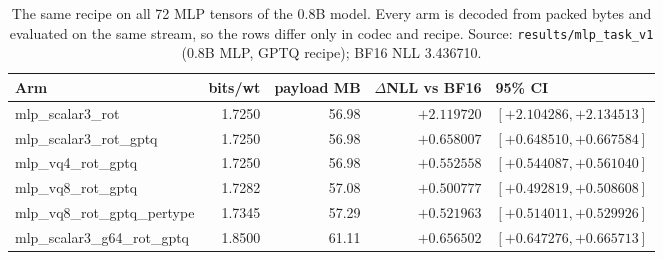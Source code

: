 \begin{table}[t]
\centering
\small
\begin{tabular}{lrrrl}
\toprule
Arm & bits/wt & payload MB & $\Delta$NLL vs BF16 & 95\% CI \\
\midrule
mlp\_scalar3\_rot & 1.7250 & 56.98 & $+2.119720$ & $[+2.104286, +2.134513]$ \\
mlp\_scalar3\_rot\_gptq & 1.7250 & 56.98 & $+0.658007$ & $[+0.648510, +0.667584]$ \\
mlp\_vq4\_rot\_gptq & 1.7250 & 56.98 & $+0.552558$ & $[+0.544087, +0.561040]$ \\
mlp\_vq8\_rot\_gptq & 1.7282 & 57.08 & $+0.500777$ & $[+0.492819, +0.508608]$ \\
mlp\_vq8\_rot\_gptq\_pertype & 1.7345 & 57.29 & $+0.521963$ & $[+0.514011, +0.529926]$ \\
mlp\_scalar3\_g64\_rot\_gptq & 1.8500 & 61.11 & $+0.656502$ & $[+0.647276, +0.665713]$ \\
\bottomrule
\end{tabular}
\caption{The same recipe on all 72 MLP tensors of the 0.8B model. Every arm is decoded from packed bytes and evaluated on the same stream, so the rows differ only in codec and recipe. Source: \texttt{results/mlp\_task\_v1} (0.8B MLP, GPTQ recipe); BF16 NLL 3.436710.}
\label{tab:mlp}
\end{table}
